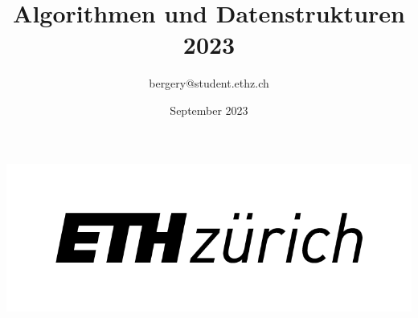 \documentclass[a4paper]{article}
\title{Algorithmen und Datenstrukturen 2023}
\author{bergery@student.ethz.ch}
\date{September 2023}
\begin{document}
\maketitle
\begin{center}
    \includegraphics{Pictures/eth_logo_kurz_pos Kopie.png}
\end{center}

\tableofcontents

    \newpage
    
    
    
    
    
    
    
\end{document}
